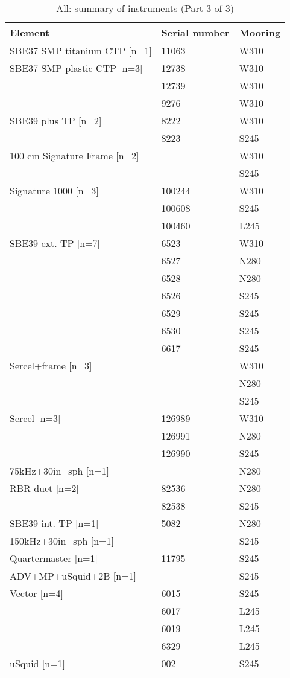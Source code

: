 \documentclass{article}
\begin{document}
\begin{table}[!htbp]
\centering
\caption{All: summary of instruments (Part 3 of 3)}
\begin{tabular}{lll}
\toprule
Element & Serial number & Mooring \\
\midrule
SBE37 SMP titanium CTP [n=1] & 11063 & W310 \\
SBE37 SMP plastic CTP [n=3] & 12738 & W310 \\
 & 12739 & W310 \\
 & 9276 & W310 \\
SBE39 plus TP [n=2] & 8222 & W310 \\
 & 8223 & S245 \\
100 cm Signature Frame [n=2] &  & W310 \\
 &  & S245 \\
Signature 1000 [n=3] & 100244 & W310 \\
 & 100608 & S245 \\
 & 100460 & L245 \\
SBE39 ext. TP [n=7] & 6523 & W310 \\
 & 6527 & N280 \\
 & 6528 & N280 \\
 & 6526 & S245 \\
 & 6529 & S245 \\
 & 6530 & S245 \\
 & 6617 & S245 \\
Sercel+frame [n=3] &  & W310 \\
 &  & N280 \\
 &  & S245 \\
Sercel [n=3] & 126989 & W310 \\
 & 126991 & N280 \\
 & 126990 & S245 \\
75kHz+30in\_sph [n=1] &  & N280 \\
RBR duet [n=2] & 82536 & N280 \\
 & 82538 & S245 \\
SBE39 int. TP [n=1] & 5082 & N280 \\
150kHz+30in\_sph [n=1] &  & S245 \\
Quartermaster [n=1] & 11795 & S245 \\
ADV+MP+uSquid+2B [n=1] &  & S245 \\
Vector [n=4] & 6015 & S245 \\
 & 6017 & L245 \\
 & 6019 & L245 \\
 & 6329 & L245 \\
uSquid [n=1] & 002 & S245 \\

\end{tabular}
\end{table}
\end{document}
